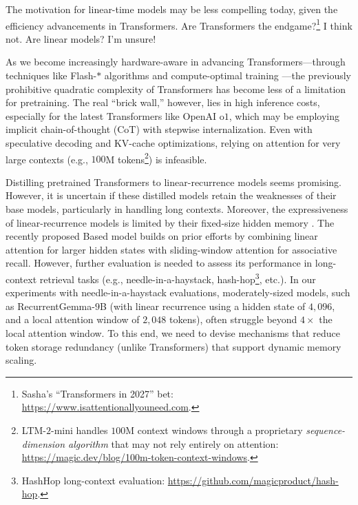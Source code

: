 The motivation for linear-time models may be less compelling today, given the efficiency advancements in Transformers.
%
Are Transformers the endgame?\footnote{Sasha's ``Transformers in 2027'' bet: \url{https://www.isattentionallyouneed.com}.} I think not.
%
Are linear models? I'm unsure!

As we become increasingly hardware-aware in advancing Transformers---through techniques like Flash-$\ast$ algorithms \citep{fu_flashfftconv_2023,shah_flashattention-3_2024} and compute-optimal training \citep{muennighoff_scaling_2023}---the previously prohibitive quadratic complexity of Transformers has become less of a limitation for pretraining.
%
The real ``brick wall,'' however, lies in high inference costs, especially for the latest Transformers like OpenAI o$1$, which may be employing implicit chain-of-thought (CoT) with stepwise internalization.
%
Even with speculative decoding and KV-cache optimizations, relying on attention for very large contexts (e.g., $100$M tokens\footnote{LTM-$2$-mini handles $100$M context windows through a proprietary \textit{sequence-dimension algorithm} that may not rely entirely on attention: \url{https://magic.dev/blog/100m-token-context-windows}.}) is infeasible.

Distilling pretrained Transformers to linear-recurrence models \citep{zhang_hedgehog_2024,wang_mamba_2024,zhang_lolcats_2024,bick_transformers_2024} seems promising.
%
However, it is uncertain if these distilled models retain the weaknesses of their base models, particularly in handling long contexts.
%
Moreover, the expressiveness of linear-recurrence models is limited by their fixed-size hidden memory \citet{jelassi_repeat_2024}.
%
The recently proposed Based model \citep{arora_simple_2024} builds on prior efforts by combining linear attention for larger hidden states with sliding-window attention for associative recall.
%
However, further evaluation is needed to assess its performance in long-context retrieval tasks (e.g., needle-in-a-haystack, hash-hop\footnote{HashHop long-context evaluation: \url{https://github.com/magicproduct/hash-hop}.}, etc.).
%
In our experiments with needle-in-a-haystack evaluations, moderately-sized models, such as RecurrentGemma-$9$B (with linear recurrence using a hidden state of $4,096$, and a local attention window of $2,048$ tokens), often struggle beyond $4\times$ the local attention window.
%
To this end, we need to devise mechanisms that reduce token storage redundancy (unlike Transformers) that support dynamic memory scaling.

